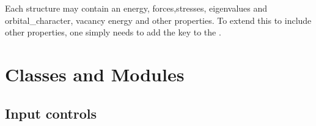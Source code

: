 \documentclass[letterpaper,10pt,english]{sphinxmanual}
\begin{document}
Each structure may contain an energy, forces,stresses, eigenvalues and orbital\_character,
vacancy energy and other properties. To extend this to include other properties, one
simply needs to add the key to the .


\chapter{Classes and Modules}
\label{classes::doc}\label{classes:classes-and-modules}

\section{Input controls}
\label{classes:input-controls}\label{classes:module-catcontrols}
\end{document}
